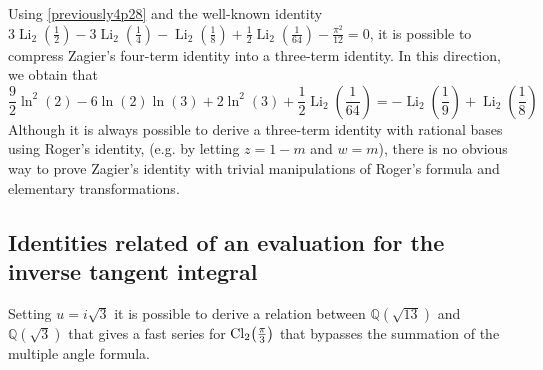 \documentclass[12pt]{article}
\begin{document}
 Using \eqref{previously4p28} and the well-known identity $3 \operatorname{Li}_2\left(\frac{1}{2}\right) - 
 3 \operatorname{Li}_2\left(\frac{1}{4}\right) - \operatorname{Li}_2\left(\frac{1}{8}\right) + 
 \frac{1}{2} \operatorname{Li}_2\left(\frac{1}{64}\right) - \frac{\pi^2}{12} = 0$, it is possible to compress Zagier's four-term identity into a 
 three-term identity. In this direction, we obtain that 
\begin{equation*}
\frac{9}{2} \ln^2(2) - 6 \ln(2) \ln(3) + 2 \ln^2(3) + 
 \frac{1}{2} \operatorname{Li}_2\left(\frac{1}{64}\right) = 
 -\operatorname{Li}_2\left(\frac{1}{9}\right) + \operatorname{Li}_2\left(\frac{1}{8}\right)
\end{equation*}
 Although it is always possible to derive a 
 three-term identity with rational bases using Roger's identity, (e.g. by letting $z=1-m$ and $w=m$), there is no obvious way to prove 
 Zagier's identity with trivial manipulations of Roger's formula and elementary transformations. 

\subsection{Identities related of an evaluation for the inverse tangent integral}
 Setting $u= i\sqrt{3}$ it is possible to derive a relation between $\mathbb{Q}(\sqrt{13})$ 
 and $\mathbb{Q}(\sqrt{3})$ 
 that gives a fast series for $\rm{Cl}_2\big(\tfrac{\pi}3\big)$ that bypasses the summation of the multiple angle formula. 
\end{document}
